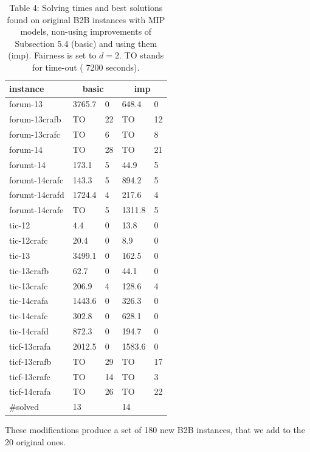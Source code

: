 \documentclass[10pt]{article}
\begin{document}
\begin{table}[h]
\begin{center}
\captionsetup{labelformat=empty}
\caption{Table 4: Solving times and best solutions found on original B2B instances with MIP models, non-using improvements of Subsection 5.4 (basic) and using them (imp). Fairness is set to $d=2$. TO stands for time-out ( 7200 seconds).}
\begin{tabular}{|l|l|l|l|l|}
\hline
instance & \multicolumn{2}{|c|}{basic} & \multicolumn{2}{|c|}{imp} \\
\hline
forum-13 & 3765.7 & 0 & 648.4 & 0 \\
\hline
forum-13crafb & TO & 22 & TO & 12 \\
\hline
forum-13crafc & TO & 6 & TO & 8 \\
\hline
forum-14 & TO & 28 & TO & 21 \\
\hline
forumt-14 & 173.1 & 5 & 44.9 & 5 \\
\hline
forumt-14crafc & 143.3 & 5 & 894.2 & 5 \\
\hline
forumt-14crafd & 1724.4 & 4 & 217.6 & 4 \\
\hline
forumt-14crafe & TO & 5 & 1311.8 & 5 \\
\hline
tic-12 & 4.4 & 0 & 13.8 & 0 \\
\hline
tic-12crafc & 20.4 & 0 & 8.9 & 0 \\
\hline
tic-13 & 3499.1 & 0 & 162.5 & 0 \\
\hline
tic-13crafb & 62.7 & 0 & 44.1 & 0 \\
\hline
tic-13crafc & 206.9 & 4 & 128.6 & 4 \\
\hline
tic-14crafa & 1443.6 & 0 & 326.3 & 0 \\
\hline
tic-14crafc & 302.8 & 0 & 628.1 & 0 \\
\hline
tic-14crafd & 872.3 & 0 & 194.7 & 0 \\
\hline
ticf-13crafa & 2012.5 & 0 & 1583.6 & 0 \\
\hline
ticf-13crafb & TO & 29 & TO & 17 \\
\hline
ticf-13crafc & TO & 14 & TO & 3 \\
\hline
ticf-14crafa & TO & 26 & TO & 22 \\
\hline
\#solved & 13 &  & 14 &  \\
\hline
\end{tabular}
\end{center}
\end{table}

These modifications produce a set of 180 new B2B instances, that we add to the 20 original ones.
\end{document}
